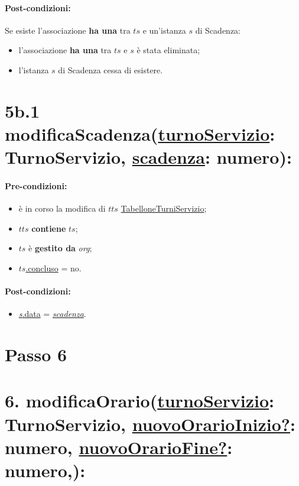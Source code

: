 \paragraph{Post-condizioni:} Se esiste l'associazione \textbf{ha una} tra $ts$ e un'istanza $s$ di Scadenza:

\begin{itemize}
\item l'associazione \textbf{ha una} tra $ts$ e $s$ è stata eliminata;
 \item l'istanza $s$ di Scadenza cessa di esistere.
\end{itemize}

\section*{5b.1 modificaScadenza(\underline{turnoServizio}: TurnoServizio, \underline{scadenza}: numero):}

\paragraph{Pre-condizioni:}
\begin{itemize}
 \item è in corso la modifica di $tts$ \underline{TabelloneTurniServizio};
  \item $tts$ \textbf{contiene} $ts$;
 \item $ts$ è \textbf{gestito da} \textit{org};
 \item \underline{$ts$.concluso} = no.
\end{itemize}

\paragraph{Post-condizioni:}
\begin{itemize}
    \item \underline{\textit{s}.data} = \underline{\textit{scadenza}}.
\end{itemize}

\section{Passo 6}
\section*{6. modificaOrario(\underline{turnoServizio}: TurnoServizio, \underline{nuovoOrarioInizio?}: numero, \underline{nuovoOrarioFine?}: numero,):}

